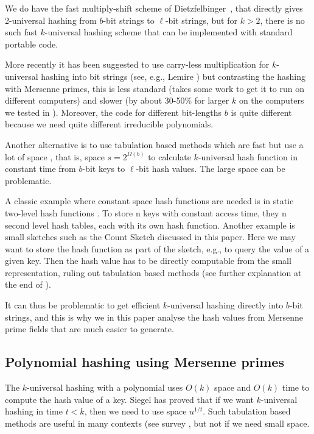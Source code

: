We do have the fast multiply-shift scheme of Dietzfelbinger~\cite{dietzfel96universal}, that directly gives 2-universal
hashing from $b$-bit strings to $\ell$-bit strings, but for $k>2$,
there is no such fast $k$-universal hashing scheme that
can be implemented with standard portable code.

More recently it has been suggested to use carry-less multiplication
for $k$-universal hashing into bit strings (see, e.g., Lemire
\cite{lemire2014strongly}) but contrasting the hashing with Mersenne primes,
this is less standard (takes some work to get it to run on different
computers) and slower (by about 30-50\% for larger $k$ on the computers we tested in ).
Moreover, the code for different bit-lengths $b$ is quite different
because we need quite different irreducible polynomials.

Another alternative is to use tabulation based methods which are fast
but use a lot of space \cite{Siegel04,Tho13:simple-simple}, that is,
space $s=2^{\Omega(b)}$ to calculate $k$-universal hash function in
constant time from $b$-bit keys to $\ell$-bit hash values. The large
space can be problematic.

A classic example where constant space hash
functions are needed is in static two-level hash functions
\cite{FKS84}.  To store n keys with constant access time, they n
second level hash tables, each with its own hash function.  Another
example is small sketches such as the Count Sketch
\cite{charikar04count-sketch} discussed in this paper. Here we may
want to store the hash function as part of the sketch, e.g., to query
the value of a given key. Then the hash value has to be directly
computable from the small representation, ruling out tabulation based
methods (see further explanation at the end of ).


It can thus be problematic to get efficient $k$-universal hashing directly into
$b$-bit strings, and this is why we in this paper analyse the
hash values from Mersenne prime fields that are much easier to generate.

\subsection{Polynomial hashing using Mersenne primes}

The $k$-universal hashing with a polynomial uses $O(k)$ space and $O(k)$ time
to compute the hash value of a key. Siegel \cite{Siegel04} has proved that if we want $k$-universal hashing in time $t<k$, then we need to use space $u^{1/t}$.
Such tabulation based methods are useful in many contexts (see survey \cite{Thorup17}, but not if we need small space.

